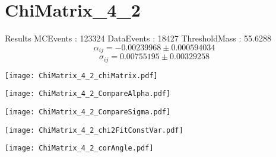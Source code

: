 \documentclass[a4paper,12pt]{article}
\begin{document}
\section{ChiMatrix\_4\_2}
\begin{minipage}{0.49\linewidth} Results \newline
MCEvents : 123324\newline
DataEvents : 18427 \newline
ThresholdMass : 55.6288\\
$$\alpha_{ij} = -0.00239968\pm 0.000594034$$
$$\sigma_{ij} = 0.00755195\pm 0.00329258$$
\end{minipage}\hfill
\begin{minipage}{0.49\linewidth} 
\texttt{[image: ChiMatrix\_4\_2\_chiMatrix.pdf]}\\
\end{minipage}
\hfill
\begin{minipage}{0.49\linewidth} 
\texttt{[image: ChiMatrix\_4\_2\_CompareAlpha.pdf]}\\
\end{minipage}
\hfill
\begin{minipage}{0.49\linewidth} 
\texttt{[image: ChiMatrix\_4\_2\_CompareSigma.pdf]}\\
\end{minipage}
\begin{minipage}{0.49\linewidth} 
\texttt{[image: ChiMatrix\_4\_2\_chi2FitConstVar.pdf]}\\
\end{minipage}
\hfill
\begin{minipage}{0.49\linewidth} 
\texttt{[image: ChiMatrix\_4\_2\_corAngle.pdf]}\\
\end{minipage}
\end{document}
